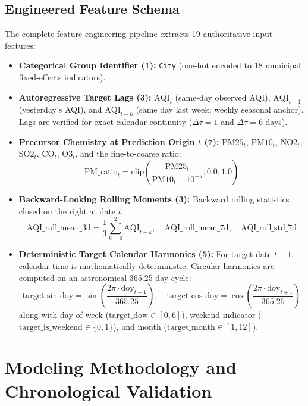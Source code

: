 \documentclass[11pt,a4paper]{report}
\begin{document}
\section{Engineered Feature Schema}
The complete feature engineering pipeline extracts 19 authoritative input features:
\begin{itemize}
    \item \textbf{Categorical Group Identifier (1):} \texttt{City} (one-hot encoded to 18 municipal fixed-effects indicators).
    \item \textbf{Autoregressive Target Lags (3):} $\text{AQI}_t$ (same-day observed AQI), $\text{AQI}_{t-1}$ (yesterday's AQI), and $\text{AQI}_{t-6}$ (same day last week; weekly seasonal anchor). Lags are verified for exact calendar continuity ($\Delta \tau = 1$ and $\Delta \tau = 6$ days).
    \item \textbf{Precursor Chemistry at Prediction Origin $t$ (7):} $\text{PM25}_t$, $\text{PM10}_t$, $\text{NO2}_t$, $\text{SO2}_t$, $\text{CO}_t$, $\text{O3}_t$, and the fine-to-coarse ratio:
    $$\text{PM\_ratio}_t = \text{clip}\left( \frac{\text{PM25}_t}{\text{PM10}_t + 10^{-5}}, 0.0, 1.0 \right)$$
    \item \textbf{Backward-Looking Rolling Moments (3):} Backward rolling statistics closed on the right at date $t$:
    $$\text{AQI\_roll\_mean\_3d} = \frac{1}{3}\sum_{k=0}^2 \text{AQI}_{t-k}, \quad \text{AQI\_roll\_mean\_7d}, \quad \text{AQI\_roll\_std\_7d}$$
    \item \textbf{Deterministic Target Calendar Harmonics (5):} For target date $t+1$, calendar time is mathematically deterministic. Circular harmonics are computed on an astronomical 365.25-day cycle:
    $$\text{target\_sin\_doy} = \sin\left(\frac{2\pi \cdot \text{doy}_{t+1}}{365.25}\right), \quad \text{target\_cos\_doy} = \cos\left(\frac{2\pi \cdot \text{doy}_{t+1}}{365.25}\right)$$
    along with day-of-week ($\text{target\_dow} \in [0, 6]$), weekend indicator ($\text{target\_is\_weekend} \in \{0, 1\}$), and month ($\text{target\_month} \in [1, 12]$).
\end{itemize}


\chapter{Modeling Methodology and Chronological Validation}
\end{document}
